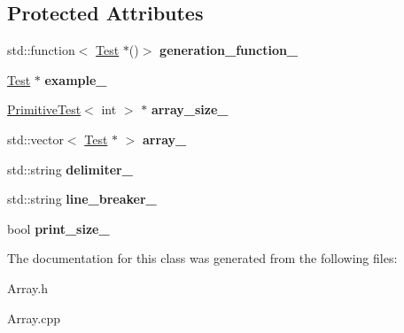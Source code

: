 \subsection*{Protected Attributes}
\begin{DoxyCompactItemize}
\item 
\mbox{\label{class_array_a575ef9a32841d1b1b56aa8ba7f8d5144}} 
std\+::function$<$ \hyperlink{class_test}{Test} $\ast$()$>$ {\bfseries generation\+\_\+function\+\_\+}
\item 
\mbox{\label{class_array_a43e6823f8b0acaf5c3b7599a9ab4d178}} 
\hyperlink{class_test}{Test} $\ast$ {\bfseries example\+\_\+}
\item 
\mbox{\label{class_array_afcafcb06168b848eeadd56c148e2d55f}} 
\hyperlink{class_primitive_test}{Primitive\+Test}$<$ int $>$ $\ast$ {\bfseries array\+\_\+size\+\_\+}
\item 
\mbox{\label{class_array_a08f0ba4ee6b95854dab20695506180a5}} 
std\+::vector$<$ \hyperlink{class_test}{Test} $\ast$ $>$ {\bfseries array\+\_\+}
\item 
\mbox{\label{class_array_ab7f48d91eb1c9747cb7b7aaddf13cb20}} 
std\+::string {\bfseries delimiter\+\_\+}
\item 
\mbox{\label{class_array_a4012ececf0120797b633f8be52b5b929}} 
std\+::string {\bfseries line\+\_\+breaker\+\_\+}
\item 
\mbox{\label{class_array_a71aba3c107c87e27ae66e9a9a703c2b2}} 
bool {\bfseries print\+\_\+size\+\_\+}
\end{DoxyCompactItemize}


The documentation for this class was generated from the following files\+:\begin{DoxyCompactItemize}
\item 
Array.\+h\item 
Array.\+cpp\end{DoxyCompactItemize}
